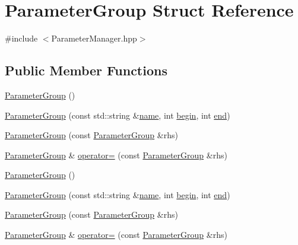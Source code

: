 \hypertarget{struct_parameter_group}{\section{Parameter\+Group Struct Reference}
\label{struct_parameter_group}
}


{\ttfamily \#include $<$Parameter\+Manager.\+hpp$>$}

\subsection*{Public Member Functions}
\begin{DoxyCompactItemize}
\item 
\hyperlink{struct_parameter_group_ac300691fbffbb5ee3e41f992793891f5}{Parameter\+Group} ()
\item 
\hyperlink{struct_parameter_group_a9d98bf3ed52f515f2f4bbbaf2fb0d55d}{Parameter\+Group} (const std\+::string \&\hyperlink{struct_parameter_group_a1c2c9357e7746d424afbd4361d0bc668}{name}, int \hyperlink{struct_parameter_group_a269c5b3ee686ccda81e6cbe70e1932bc}{begin}, int \hyperlink{struct_parameter_group_adc97d1628d57d1e23c7a047b57087916}{end})
\item 
\hyperlink{struct_parameter_group_af09957ea9afbc2c73a1d7651def78030}{Parameter\+Group} (const \hyperlink{struct_parameter_group}{Parameter\+Group} \&rhs)
\item 
\hyperlink{struct_parameter_group}{Parameter\+Group} \& \hyperlink{struct_parameter_group_ae97472213f8493f09bc4e5270fe0ca3b}{operator=} (const \hyperlink{struct_parameter_group}{Parameter\+Group} \&rhs)
\item 
\hyperlink{struct_parameter_group_ac300691fbffbb5ee3e41f992793891f5}{Parameter\+Group} ()
\item 
\hyperlink{struct_parameter_group_a9d98bf3ed52f515f2f4bbbaf2fb0d55d}{Parameter\+Group} (const std\+::string \&\hyperlink{struct_parameter_group_a1c2c9357e7746d424afbd4361d0bc668}{name}, int \hyperlink{struct_parameter_group_a269c5b3ee686ccda81e6cbe70e1932bc}{begin}, int \hyperlink{struct_parameter_group_adc97d1628d57d1e23c7a047b57087916}{end})
\item 
\hyperlink{struct_parameter_group_af09957ea9afbc2c73a1d7651def78030}{Parameter\+Group} (const \hyperlink{struct_parameter_group}{Parameter\+Group} \&rhs)
\item 
\hyperlink{struct_parameter_group}{Parameter\+Group} \& \hyperlink{struct_parameter_group_a0363c0098de3ffa3014350fc4ce3dffd}{operator=} (const \hyperlink{struct_parameter_group}{Parameter\+Group} \&rhs)
\end{DoxyCompactItemize}
